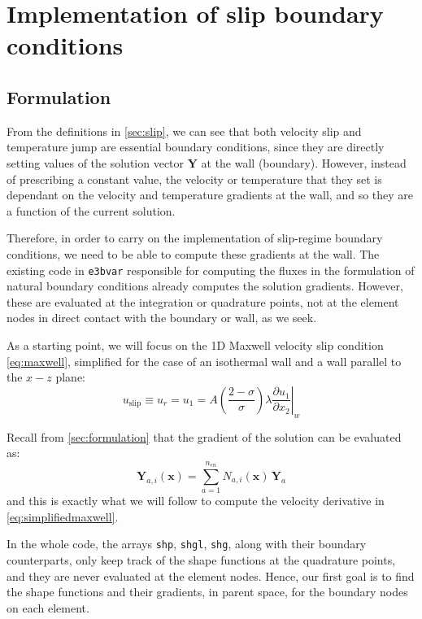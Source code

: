 \documentclass{ucb}
\begin{document}
\section{Implementation of slip boundary conditions}

\subsection{Formulation}
\label{sec:slipformulation}

From the definitions in \autoref{sec:slip}, we can see that both velocity slip and temperature jump are essential boundary conditions, since they are directly setting values of the solution vector $\bm{Y}$ at the wall (boundary). However, instead of prescribing a constant value, the velocity or temperature that they set is dependant on the velocity and temperature gradients at the wall, and so they are a function of the current solution.

Therefore, in order to carry on the implementation of slip-regime boundary conditions, we need to be able to compute these gradients at the wall. The existing code in \texttt{e3bvar} responsible for computing the fluxes in the formulation of natural boundary conditions already computes the solution gradients. However, these are evaluated at the integration or quadrature points, not at the element nodes in direct contact with the boundary or wall, as we seek.

As a starting point, we will focus on the 1D Maxwell velocity slip condition \eqref{eq:maxwell}, simplified for the case of an isothermal wall and a wall parallel to the $x-z$ plane:
\begin{equation}
    u_\mathrm{slip} \equiv u_r = u_1 = A\left(\frac{2-\sigma}{\sigma}\right)\lambda\left.\frac{\partial u_1}{\partial x_2}\right|_w
    \label{eq:simplifiedmaxwell}
\end{equation}

Recall from \autoref{sec:formulation} that the gradient of the solution can be evaluated as:
\begin{equation}
    \bm{Y}_{a,i}(\bm{x}) = \sum_{a = 1}^{n_{en}} N_{a,i}(\bm{x})\,\bm{Y}_a
    \label{eq:Yai}
\end{equation}
and this is exactly what we will follow to compute the velocity derivative in \autoref{eq:simplifiedmaxwell}.

In the whole code, the arrays \texttt{shp}, \texttt{shgl}, \texttt{shg}, along with their boundary counterparts, only keep track of the shape functions at the quadrature points, and they are never evaluated at the element nodes. Hence, our first goal is to find the shape functions and their gradients, in parent space, for the boundary nodes on each element.
\end{document}
